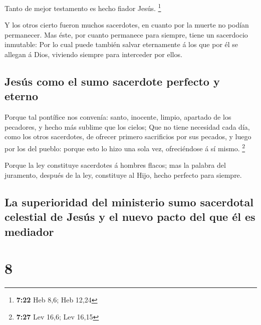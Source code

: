  Tanto de mejor testamento es hecho fiador Jesús.
\footnote{\textbf{7:22} Heb 8,6; Heb 12,24}

 Y los otros cierto fueron muchos sacerdotes, en cuanto por
la muerte no podían permanecer.  Mas éste, por cuanto
permanece para siempre, tiene un sacerdocio inmutable:  Por
lo cual puede también salvar eternamente á los que por él se allegan á
Dios, viviendo siempre para interceder por ellos.

\hypertarget{jesuxfas-como-el-sumo-sacerdote-perfecto-y-eterno}{%
\subsection{Jesús como el sumo sacerdote perfecto y
eterno}\label{jesuxfas-como-el-sumo-sacerdote-perfecto-y-eterno}}

 Porque tal pontífice nos convenía: santo, inocente,
limpio, apartado de los pecadores, y hecho más sublime que los cielos;
 Que no tiene necesidad cada día, como los otros
sacerdotes, de ofrecer primero sacrificios por sus pecados, y luego por
los del pueblo: porque esto lo hizo una sola vez, ofreciéndose á sí
mismo. \footnote{\textbf{7:27} Lev 16,6; Lev 16,15}

 Porque la ley constituye sacerdotes á hombres flacos; mas
la palabra del juramento, después de la ley, constituye al Hijo, hecho
perfecto para siempre.

\hypertarget{la-superioridad-del-ministerio-sumo-sacerdotal-celestial-de-jesuxfas-y-el-nuevo-pacto-del-que-uxe9l-es-mediador}{%
\subsection{La superioridad del ministerio sumo sacerdotal celestial de
Jesús y el nuevo pacto del que él es
mediador}\label{la-superioridad-del-ministerio-sumo-sacerdotal-celestial-de-jesuxfas-y-el-nuevo-pacto-del-que-uxe9l-es-mediador}}

\hypertarget{section-7}{%
\section{8}\label{section-7}}

